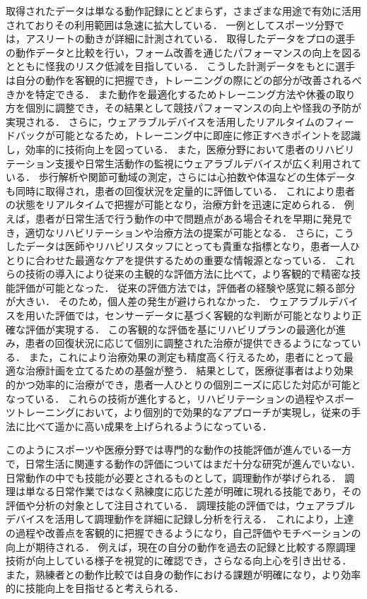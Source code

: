 取得されたデータは単なる動作記録にとどまらず，さまざまな用途で有効に活用されておりその利用範囲は急速に拡大している．
一例としてスポーツ分野では，アスリートの動きが詳細に計測されている．
取得したデータをプロの選手の動作データと比較を行い，フォーム改善を通じたパフォーマンスの向上を図るとともに怪我のリスク低減を目指している．
こうした計測データをもとに選手は自分の動作を客観的に把握でき，トレーニングの際にどの部分が改善されるべきかを特定できる．
また動作を最適化するためトレーニング方法や休養の取り方を個別に調整でき，その結果として競技パフォーマンスの向上や怪我の予防が実現される．
さらに，ウェアラブルデバイスを活用したリアルタイムのフィードバックが可能となるため，トレーニング中に即座に修正すべきポイントを認識し，効率的に技術向上を図っている．
また，医療分野において患者のリハビリテーション支援や日常生活動作の監視にウェアラブルデバイスが広く利用されている．
歩行解析や関節可動域の測定，さらには心拍数や体温などの生体データも同時に取得され，患者の回復状況を定量的に評価している．
これにより患者の状態をリアルタイムで把握が可能となり，治療方針を迅速に定められる．
例えば，患者が日常生活で行う動作の中で問題点がある場合それを早期に発見でき，適切なリハビリテーションや治療方法の提案が可能となる．
さらに，こうしたデータは医師やリハビリスタッフにとっても貴重な指標となり，患者一人ひとりに合わせた最適なケアを提供するための重要な情報源となっている．
これらの技術の導入により従来の主観的な評価方法に比べて，より客観的で精密な技能評価が可能となった．
従来の評価方法では，評価者の経験や感覚に頼る部分が大きい．
そのため，個人差の発生が避けられなかった．
ウェアラブルデバイスを用いた評価では，センサーデータに基づく客観的な判断が可能となりより正確な評価が実現する．
この客観的な評価を基にリハビリプランの最適化が進み，患者の回復状況に応じて個別に調整された治療が提供できるようになっている．
また，これにより治療効果の測定も精度高く行えるため，患者にとって最適な治療計画を立てるための基盤が整う．
結果として，医療従事者はより効果的かつ効率的に治療ができ，患者一人ひとりの個別ニーズに応じた対応が可能となっている．
これらの技術が進化すると，リハビリテーションの過程やスポーツトレーニングにおいて，より個別的で効果的なアプローチが実現し，従来の手法に比べて遥かに高い成果を上げられるようになっている．

このようにスポーツや医療分野では専門的な動作の技能評価が進んでいる一方で，日常生活に関連する動作の評価についてはまだ十分な研究が進んでいない．
日常動作の中でも技能が必要とされるものとして，調理動作が挙げられる．
調理は単なる日常作業ではなく熟練度に応じた差が明確に現れる技能であり，その評価や分析の対象として注目されている．
調理技能の評価では，ウェアラブルデバイスを活用して調理動作を詳細に記録し分析を行える．
これにより，上達の過程や改善点を客観的に把握できるようになり，自己評価やモチベーションの向上が期待される．
例えば，現在の自分の動作を過去の記録と比較する際調理技術が向上している様子を視覚的に確認でき，さらなる向上心を引き出せる．
また，熟練者との動作比較では自身の動作における課題が明確になり，より効率的に技能向上を目指せると考えられる．

